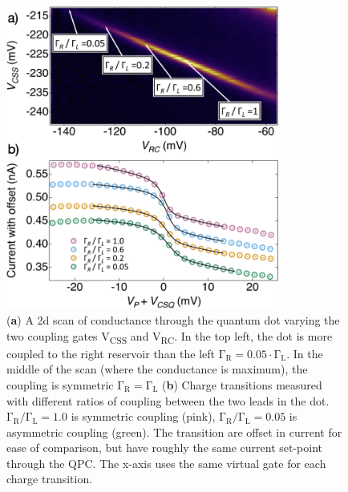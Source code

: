 \begin{figure}[ht]
  \begin{center}
    \includegraphics[width=0.8\textwidth]{figures/ch3/crop_FiguresMaster.018.png}
    \caption[Conductance vs. Occupation : Picking locations of varying coupling symmetry]{\label{fig:ch3/symmetry_picking} 
     (\textbf{a}) A 2d scan of conductance through the quantum dot varying the two coupling gates V\textsubscript{CSS} and V\textsubscript{RC}. In the top left, the dot is more coupled to the right reservoir than the left $\mathrm{\Gamma_R} = 0.05\cdot\mathrm{\Gamma_L}$. In the middle of the scan (where the conductance is maximum), the coupling is symmetric $\mathrm{\Gamma_R} = \mathrm{\Gamma_L}$ (\textbf{b}) Charge transitions measured with different ratios of coupling between the two leads in the dot. $\mathrm{\Gamma_R/\Gamma_L} = 1.0$ is symmetric coupling (pink), $\mathrm{\Gamma_R/\Gamma_L} = 0.05$ is asymmetric coupling (green). The transition are offset in current for ease of comparison, but have roughly the same current set-point through the QPC. The x-axis uses the same virtual gate for each charge transition. 
    }
  \end{center}
\end{figure}


